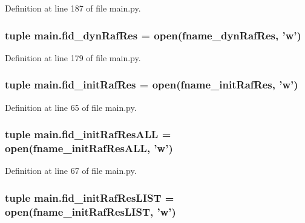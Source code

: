Definition at line 187 of file main.\-py.

\hypertarget{a00122_aaff6b4fb4c2e2089c2a207a12f1757e3}{
\subsubsection[{fid\-\_\-dyn\-Raf\-Res}]{\setlength{\rightskip}{0pt plus 5cm}tuple main.\-fid\-\_\-dyn\-Raf\-Res = open({\bf fname\-\_\-dyn\-Raf\-Res}, 'w')}}\label{a00122_aaff6b4fb4c2e2089c2a207a12f1757e3}


Definition at line 179 of file main.\-py.

\hypertarget{a00122_a98d514a663f6bedde329d0bbbd2b78fa}{
\subsubsection[{fid\-\_\-init\-Raf\-Res}]{\setlength{\rightskip}{0pt plus 5cm}tuple main.\-fid\-\_\-init\-Raf\-Res = open({\bf fname\-\_\-init\-Raf\-Res}, 'w')}}\label{a00122_a98d514a663f6bedde329d0bbbd2b78fa}


Definition at line 65 of file main.\-py.

\hypertarget{a00122_a45aeb03f0d9cc30cb0a490354fd76d6c}{
\subsubsection[{fid\-\_\-init\-Raf\-Res\-A\-L\-L}]{\setlength{\rightskip}{0pt plus 5cm}tuple main.\-fid\-\_\-init\-Raf\-Res\-A\-L\-L = open({\bf fname\-\_\-init\-Raf\-Res\-A\-L\-L}, 'w')}}\label{a00122_a45aeb03f0d9cc30cb0a490354fd76d6c}


Definition at line 67 of file main.\-py.

\hypertarget{a00122_ae24c607a37f0f3f23d7e87f6bb4fe45b}{
\subsubsection[{fid\-\_\-init\-Raf\-Res\-L\-I\-S\-T}]{\setlength{\rightskip}{0pt plus 5cm}tuple main.\-fid\-\_\-init\-Raf\-Res\-L\-I\-S\-T = open({\bf fname\-\_\-init\-Raf\-Res\-L\-I\-S\-T}, 'w')}}\label{a00122_ae24c607a37f0f3f23d7e87f6bb4fe45b}


